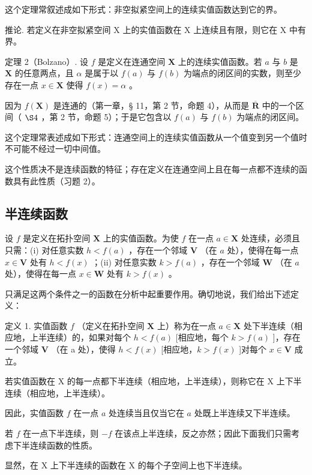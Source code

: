 这个定理常叙述成如下形式：非空拟紧空间上的连续实值函数达到它的界。

推论. 若定义在非空拟紧空间 X 上的实值函数在 X 上连续且有限，则它在 X 中有界。

定理 2（Bolzano）. 设 \(f\) 是定义在连通空间 \(\mathbf{X}\) 上的连续实值函数。若 \(a\) 与 \(b\) 是 \(\mathbf{X}\) 的任意两点，且 \(\alpha\) 是属于以 \(f(a)\) 与 \(f(b)\) 为端点的闭区间的实数，则至少存在一点 \(x \in \mathbf{X}\) 使得 \(f(x) = \alpha\) 。

因为 \(f(\mathbf{X})\) 是连通的（第一章，§ 11，第 2 节，命题 4），从而是 \(\overline{\mathbf{R}}\) 中的一个区间（ \(\S 4\) ，第 2 节，命题 5）；于是它包含以 \(f(a)\) 与 \(f(b)\) 为端点的闭区间。

这个定理常表述成如下形式：连通空间上的连续实值函数从一个值变到另一个值时不可能不经过一切中间值。

这个性质决不是连续函数的特征；存在定义在连通空间上且在每一点都不连续的函数具有此性质（习题 2）。

\subsection{半连续函数}

设 \(f\) 是定义在拓扑空间 \(\mathbf{X}\) 上的实值函数。为使 \(f\) 在一点 \(a \in \mathbf{X}\) 处连续，必须且只需：(i) 对任意实数 \(h < f(a)\) ，存在一个邻域 \(\mathbf{V}\) （在 \(a\) 处），使得在每一点 \(x \in \mathbf{V}\) 处有 \(h < f(x)\) ；(ii) 对任意实数 \(k > f(a)\) ，存在一个邻域 \(\mathbf{W}\) （在 \(a\) 处），使得在每一点 \(x \in \mathbf{W}\) 处有 \(k > f(x)\) 。

只满足这两个条件之一的函数在分析中起重要作用。确切地说，我们给出下述定义：

定义 1. 实值函数 \(f\) （定义在拓扑空间 \(\mathbf{X}\) 上）称为在一点 \(a \in \mathbf{X}\) 处下半连续（相应地，上半连续）的，如果对每个 \(h < f(a)\) {[}相应地，每个 \(k > f(a)\) {]}，存在一个邻域 \(\mathbf{V}\) （在 a 处），使得 \(h < f(x)\) {[}相应地，\(k > f(x)\) {]}对每个 \(x \in \mathbf{V}\) 成立。

若实值函数在 X 的每一点都下半连续（相应地，上半连续），则称它在 X 上下半连续（相应地，上半连续）。

因此，实值函数 \(f\) 在一点 \(a\) 处连续当且仅当它在 \(a\) 处既上半连续又下半连续。

若 \(f\) 在一点下半连续，则 \(-f\) 在该点上半连续，反之亦然；因此下面我们只需考虑下半连续函数的性质。

显然，在 X 上下半连续的函数在 X 的每个子空间上也下半连续。

